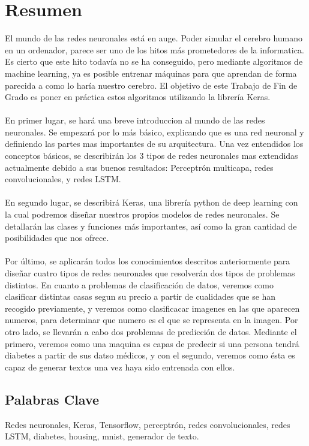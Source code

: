 \chapter*{Resumen}
El mundo de las redes neuronales está en auge. Poder simular el cerebro humano en un ordenador, parece ser uno de los hitos más prometedores de la informatica. Es cierto que este hito todavía no se ha conseguido, pero mediante algoritmos de machine learning, ya es posible entrenar máquinas para que aprendan de forma parecida a como lo haría nuestro cerebro. El objetivo de este Trabajo de Fin de Grado es poner en práctica estos algoritmos utilizando la librería Keras.\\\\
En primer lugar, se hará una breve introduccion al mundo de las redes neuronales. Se empezará por lo más básico, explicando que es una red neuronal y definiendo las partes mas importantes de su arquitectura. Una vez entendidos los conceptos básicos, se describirán los 3 tipos de redes neuronales mas extendidas actualmente debido a sus buenos resultados: Perceptrón multicapa, redes convolucionales, y redes LSTM.\\\\
En segundo lugar, se describirá Keras, una librería python de deep learning con la cual podremos diseñar nuestros propios modelos de redes neuronales. Se detallarán las clases y funciones más importantes, así como la gran cantidad de posibilidades que nos ofrece.\\\\
Por último, se aplicarán todos los conocimientos descritos anteriormente para diseñar cuatro tipos de redes neuronales que resolverán dos tipos de problemas distintos. En cuanto a problemas de clasificación de datos, veremos como clasificar distintas casas segun su precio a partir de cualidades que se han recogido previamente, y veremos como clasificacar imagenes en las que aparecen numeros, para determinar que numero es el que se representa en la imagen. Por otro lado, se llevarán a cabo dos problemas de predicción de datos. Mediante el primero, veremos como una maquina es capas de predecir si una persona tendrá diabetes a partir de sus datso médicos, y con el segundo, veremos como ésta es capaz de generar textos una vez haya sido entrenada con ellos.

\section*{Palabras Clave}
Redes neuronales, Keras, Tensorflow, perceptrón, redes convolucionales, redes LSTM, diabetes, housing, mnist, generador de texto.

